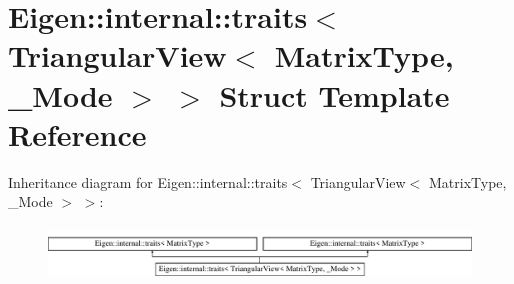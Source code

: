 \hypertarget{struct_eigen_1_1internal_1_1traits_3_01_triangular_view_3_01_matrix_type_00_01___mode_01_4_01_4}{}\section{Eigen\+:\+:internal\+:\+:traits$<$ Triangular\+View$<$ Matrix\+Type, \+\_\+\+Mode $>$ $>$ Struct Template Reference}
\label{struct_eigen_1_1internal_1_1traits_3_01_triangular_view_3_01_matrix_type_00_01___mode_01_4_01_4}
Inheritance diagram for Eigen\+:\+:internal\+:\+:traits$<$ Triangular\+View$<$ Matrix\+Type, \+\_\+\+Mode $>$ $>$\+:\begin{figure}[H]
\begin{center}
\leavevmode
\includegraphics[height=1.481482cm]{struct_eigen_1_1internal_1_1traits_3_01_triangular_view_3_01_matrix_type_00_01___mode_01_4_01_4}
\end{center}
\end{figure}
